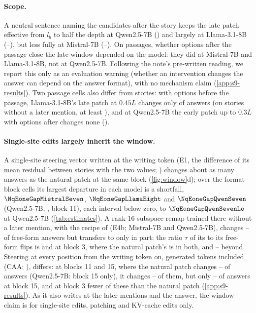 \paragraph{Scope.}
A neutral sentence naming the candidates after the story keeps the late patch effective from $l_b$ to half the depth at Qwen2.5-7B (\NqPostLateFromLbMinQwenSeven) and largely at Llama-3.1-8B (\NqPostLateFromLbMinLlamaEight--\NqPostLateFromLbMaxLlamaEight), but less fully at Mistral-7B (\NqPostLateFromLbMinMistralSeven--\NqPostLateFromLbMaxMistralSeven). On passages, whether options after the passage close the late window depended on the model: they did at Mistral-7B and Llama-3.1-8B, not at Qwen2.5-7B. Following the note's pre-written reading, we report this only as an evaluation warning (whether an intervention changes the answer can depend on the answer format), with no mechanism claim (\cref{app:s9-results}). Two passage cells also differ from stories: with options before the passage, Llama-3.1-8B's late patch at $0.45L$ changes only \ci{\NqPsgLateOptbFortyfiveLlamaEight}{\NqPsgLateOptbFortyfiveLlamaEightLo}{\NqPsgLateOptbFortyfiveLlamaEightHi} of answers (on stories without a later mention, at least \NqPoneMinMin), and at Qwen2.5-7B the early patch up to $0.3L$ with options after changes none (\NqPsgEarlyOptaThirtyQwenSeven).

\paragraph{Single-site edits largely inherit the window.}
A single-site steering vector written at the writing token (E1, the difference of its mean residual between stories with the two values; \citealp{turner2023actadd,panickssery2023caa}) changes about as many answers as the natural patch at the same block (\cref{fig:window}d); over the \NqEoneCellsAll{} format--block cells its largest departure in each model is a shortfall, $\NqEoneGapMistralSeven$, $\NqEoneGapLlamaEight$ and $\NqEoneGapQwenSeven$ (Qwen2.5-7B, \fmtListA, block 11), each interval below zero, to $\NqEoneGapQwenSevenLo$ at Qwen2.5-7B (\cref{tab:estimates}). A rank-16 subspace remap trained there without a later mention, with the recipe of \citet{anonymous2026fitted} (E4b; Mistral-7B and Qwen2.5-7B), changes \NqEfourbNoneMin--\NqEfourbNoneMax{} of free-form answers but transfers to \fmtListA{} only in part: the ratio $\tau$ of its \fmtListA{} to its free-form flips is \NqTauEfourbThreeMistralSeven{} and \NqTauEfourbThreeQwenSeven{} at block 3, where the natural patch's is \NqTauNatThreeMistralSeven{} in both, and \NqTauEfourbBeyondMin--\NqTauEfourbBeyondMax{} beyond. Steering at every position from the writing token on, generated tokens included (CAA; \citealp{panickssery2023caa}), differs: at blocks 11 and 15, where the natural patch changes \NqPfivecNatReadMin--\NqPfivecNatReadMax{} of \fmtListA{} answers (Qwen2.5-7B: block 15 only), it changes \NqPfivecCaaMin--\NqPfivecCaaMax{} of them, but only \NqEditCaaLetterFifteenQwenSeven--\NqEditCaaLetterFifteenMistralSeven{} of \fmtLetter{} answers at block 15, and at block 3 fewer of these than the natural patch (\cref{app:s9-results}). As it also writes at the later mentions and the answer, the window claim is for single-site edits, patching and KV-cache edits only.

